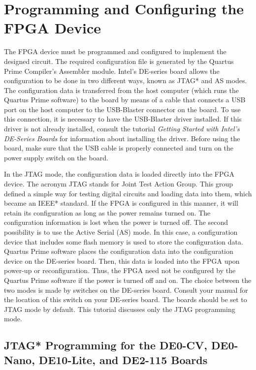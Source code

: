 \section{Programming and Configuring the FPGA Device}


The FPGA device must be programmed and configured to implement the designed 
circuit. The required configuration file is generated by the Quartus Prime 
Compiler's Assembler module. Intel's DE-series board allows the configuration to 
be done in two different ways, known as JTAG* and AS modes.
The configuration data is transferred from the host computer (which runs the 
Quartus Prime software) to the board by means of a cable that connects 
a USB port on the host computer to the USB-Blaster connector on the board.
To use this connection, it is necessary to have the USB-Blaster driver 
installed. If this driver is not already installed, consult the 
tutorial {\it Getting Started with Intel's DE-Series Boards}
for information about installing the driver.
Before using the board, make sure that the USB cable is properly connected
and turn on the power supply switch on the board.
 
In the JTAG mode, the configuration data is loaded directly
into the FPGA device. The acronym JTAG stands for Joint Test Action Group. 
This group defined a simple way for testing digital circuits and loading data 
into them, which became an IEEE* standard. If the FPGA is configured in 
this manner, it will retain its 
configuration as long as the power remains turned on. 
The configuration information is lost when the power is turned off.
The second possibility is to use the Active Serial (AS) mode.
In this case, a configuration device that includes some flash memory is used 
to store the configuration data. Quartus Prime software places the configuration 
data into the configuration device on the DE-series board. Then, this data is loaded 
into the FPGA upon power-up or reconfiguration.
Thus, the FPGA need not be configured by the Quartus Prime software if the power 
is turned off and on. 
The choice between the two modes is made by switches on the DE-series 
board. Consult your manual for the location of this switch on your DE-series board. The boards should be set to JTAG mode by default.
This tutorial discusses only the JTAG programming mode.

\subsection{JTAG* Programming for the DE0-CV, DE0-Nano, DE10-Lite, and DE2-115 Boards}

